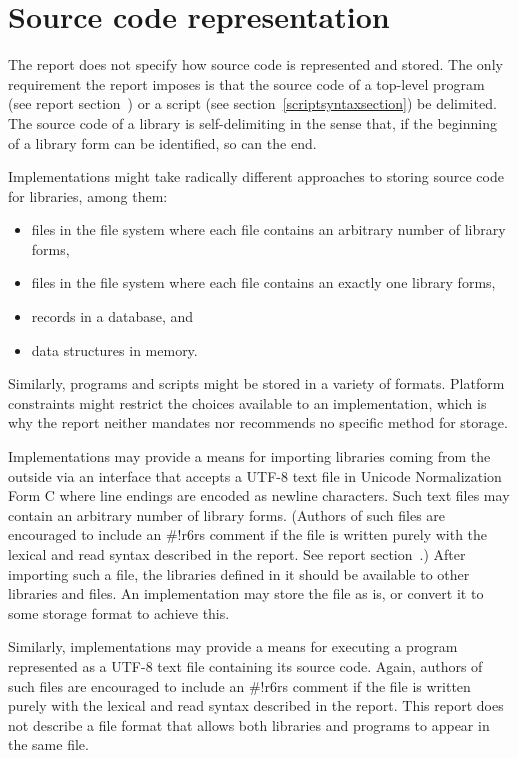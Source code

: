 \chapter{Source code representation}
\label{sourcecoderepappendix}

The report does not specify how source code is represented and stored.
The only requirement the report imposes is that the source code of a
top-level program (see report
section~) or a script (see section~\ref{scriptsyntaxsection}) be
delimited.  The source code of a library is self-delimiting in the
sense that, if the beginning of a library form can be identified, so
can the end.

Implementations might take radically different approaches to storing
source code for libraries, among them:
%
\begin{itemize}
\item files in the file system where each file contains an
  arbitrary number of library forms,
\item files in the file system where each file contains an
  exactly one library forms,
\item records in a database, and
\item data structures in memory.
\end{itemize}
%
Similarly, programs and scripts might be stored in a variety of
formats.  Platform constraints might restrict the choices available to
an implementation, which is why the report neither mandates nor
recommends no specific method for storage.

Implementations may provide a means for importing libraries coming
from the outside via an interface that accepts a UTF-8 text file in
Unicode Normalization Form C where line endings are encoded as newline
characters.  Such text files may contain an arbitrary number of
library forms.  (Authors of such files are encouraged to include an
{\cf\#!r6rs} comment if the file is written purely with the lexical
and read syntax described in the report.  See report
section~.)  After importing such a file, the libraries defined in
it should be available to other libraries and files.  An
implementation may store the file as is, or convert it to some storage
format to achieve this.

Similarly, implementations may provide a means for executing a program
represented as a UTF-8 text file containing its source code.  Again,
authors of such files are encouraged to include an {\cf\#!r6rs}
comment if the file is written purely with the lexical and read syntax
described in the report.  This report does not describe a file format
that allows both libraries and programs to appear in the same file.

